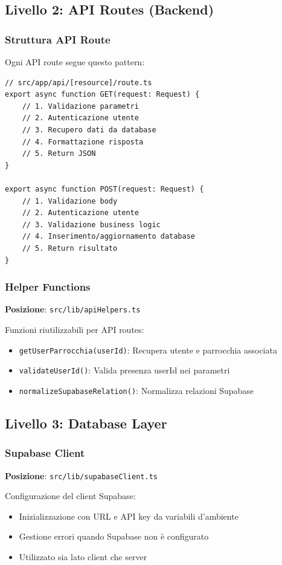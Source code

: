 \documentclass{article}
\begin{document}
\subsection{Livello 2: API Routes (Backend)}

\subsubsection{Struttura API Route}
Ogni API route segue questo pattern:

\begin{lstlisting}
// src/app/api/[resource]/route.ts
export async function GET(request: Request) {
    // 1. Validazione parametri
    // 2. Autenticazione utente
    // 3. Recupero dati da database
    // 4. Formattazione risposta
    // 5. Return JSON
}

export async function POST(request: Request) {
    // 1. Validazione body
    // 2. Autenticazione utente
    // 3. Validazione business logic
    // 4. Inserimento/aggiornamento database
    // 5. Return risultato
}
\end{lstlisting}

\subsubsection{Helper Functions}
\textbf{Posizione}: \texttt{src/lib/apiHelpers.ts}

Funzioni riutilizzabili per API routes:
\begin{itemize}
\item \texttt{getUserParrocchia(userId)}: Recupera utente e parrocchia associata
\item \texttt{validateUserId()}: Valida presenza userId nei parametri
\item \texttt{normalizeSupabaseRelation()}: Normalizza relazioni Supabase
\end{itemize}

\subsection{Livello 3: Database Layer}

\subsubsection{Supabase Client}
\textbf{Posizione}: \texttt{src/lib/supabaseClient.ts}

Configurazione del client Supabase:
\begin{itemize}
\item Inizializzazione con URL e API key da variabili d'ambiente
\item Gestione errori quando Supabase non è configurato
\item Utilizzato sia lato client che server
\end{itemize}
\end{document}
